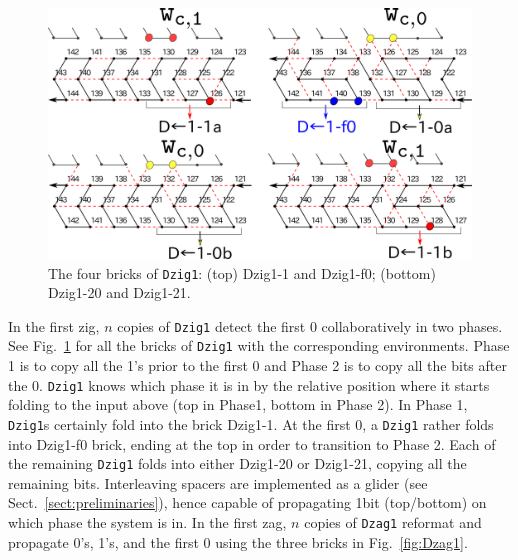 \documentclass[runningheads]{llncs}
\begin{document}
\begin{figure}
\vspace*{-5mm}
\centering
\includegraphics[width=\linewidth]{Figs/DFAO-zig1.png}  
\caption{The four bricks of \texttt{Dzig1}: (top) Dzig1-1 and Dzig1-f0; (bottom) Dzig1-20 and Dzig1-21.}
\label{fig:DFAO-zig1}
\vspace*{-3mm}
\end{figure}

In the first zig, $n$ copies of \texttt{Dzig1} detect the first 0 collaboratively in two phases. 
See Fig.~\ref{fig:DFAO-zig1} for all the bricks of \texttt{Dzig1} with the corresponding environments. 
Phase 1 is to copy all the 1's prior to the first 0 and Phase 2 is to copy all the bits after the 0. 
\texttt{Dzig1} knows which phase it is in by the relative position where it starts folding to the input above (top in Phase1, bottom in Phase 2). 
In Phase 1, \texttt{Dzig1}s certainly fold into the brick Dzig1-1. 
At the first 0, a \texttt{Dzig1} rather folds into Dzig1-f0 brick, ending at the top in order to transition to Phase 2. 
Each of the remaining \texttt{Dzig1} folds into either Dzig1-20 or Dzig1-21, copying all the remaining bits. 
Interleaving spacers are implemented as a glider (see Sect.~\ref{sect:preliminaries}), hence capable of propagating 1bit (top/bottom) on which phase the system is in. 
In the first zag, $n$ copies of \texttt{Dzag1} reformat and propagate 0's, 1's, and the first 0 using the three bricks in Fig.~\ref{fig:Dzag1}.
\end{document}
